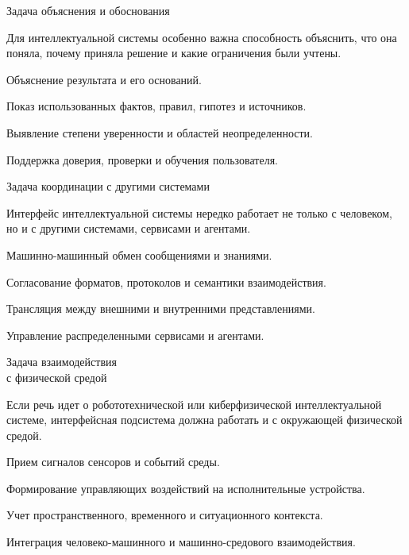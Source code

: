 \begin{frame}{Задача объяснения и обоснования}
	\topline
	\justifying

	Для интеллектуальной системы особенно важна способность объяснить, что она поняла, почему приняла решение и какие ограничения были учтены.
	
	\begin{textitemize}
		\item Объяснение результата и его оснований.
		\item Показ использованных фактов, правил, гипотез и источников.
		\item Выявление степени уверенности и областей неопределенности.
		\item Поддержка доверия, проверки и обучения пользователя.
	\end{textitemize}
\end{frame}

\begin{frame}{Задача координации с другими системами}
	\topline
	\justifying

	Интерфейс интеллектуальной системы нередко работает не только с человеком, но и с другими системами, сервисами и агентами.
	
	\begin{textitemize}
		\item Машинно-машинный обмен сообщениями и знаниями.
		\item Согласование форматов, протоколов и семантики взаимодействия.
		\item Трансляция между внешними и внутренними представлениями.
		\item Управление распределенными сервисами и агентами.
	\end{textitemize}
\end{frame}

\begin{frame}{Задача взаимодействия\\ с физической средой}
	\topline
	\justifying

	Если речь идет о робототехнической или киберфизической интеллектуальной системе, интерфейсная подсистема должна работать и с окружающей физической средой.
	
	\begin{textitemize}
		\item Прием сигналов сенсоров и событий среды.
		\item Формирование управляющих воздействий на исполнительные устройства.
		\item Учет пространственного, временного и ситуационного контекста.
		\item Интеграция человеко-машинного и машинно-средового взаимодействия.
	\end{textitemize}
\end{frame}

